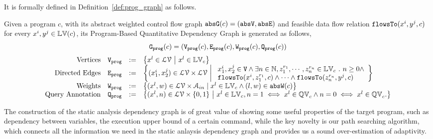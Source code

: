 It is formally defined in Definition~\ref{def:prog_graph} as follows.
\begin{defn}
  \label{def:prog_graph}
Given a program $c$, with its abstract weighted control flow graph $\mathtt{abs}{\mathtt{G}}(c) = (\mathtt{abs}{\mathtt{V}}, \mathtt{abs}{\mathtt{E}})$ and 
feasible data flow relation $\mathtt{flowsTo}(x^i, y^j, c)$ for every $x^i, y^j \in \mathbb{LV}(c)$, its Program-Based Quantitative Dependency Graph
is generated as follows,
$$\mathtt{{G_{prog}}}(c) = (\mathtt{{V_{prog}}}(c), \mathtt{{E_{prog}}}(c), \mathtt{{W_{prog}}}(c), \mathtt{{Q_{prog}}}(c))$$
{\footnotesize
\[
\begin{array}{rlcl}
\text{Vertices} &
\progV & := & \left\{ 
x^l \in \mathcal{LV} 
~ \middle\vert ~
x^l \in \lvar_{c}
\right\}
\\
\text{Directed Edges} &
\progE & := & 
\left\{ 
({x}_1^{i}, {x}_2^{j}) \in \mathcal{LV} \times \mathcal{LV}
~ \middle\vert ~
\begin{array}{l}
  {x}_1^{i}, {x}_2^{j} \in \vertxs
\land
  \exists n \in \mathbb{N}, z_1^{r_1}, \cdots, z_n^{r_n} \in \lvar_{{c}} \st 
  n \geq 0 \land
  \\
  \flowsto(x^i,  z_1^{r_1}, c) 
  \land \cdots \land \flowsto(z_n^{r_n}, y^j, c) 
\end{array}
\right\}
\\
\text{Weights} &
\progW & := &
\left\{ (x^l, w) \in  \mathcal{LV} \times \mathcal{A}_{in}
\mid
x^l \in \lvar_{{c}} \land (l, w) \in \absW(c)
\right\}
\\
\text{Query Annotation} &
\progF & := & 
\left\{(x^l, n)  \in  \mathcal{LV} \times \{0, 1\} 
~ \middle\vert ~
x^l \in \lvar_{c},
n = 1 \iff x^l \in \qvar_{c} \land n = 0 \iff  x^l \in \qvar_{c} .
\right\}
\end{array}
\] }
\end{defn}
The construction of the static analysis dependency graph is of great value of showing some useful properties of the target program,
such as dependency between variables, the execution upper bound of a certain command,
while the key novelty is our path searching algorithm, which connects all the information we need in the static anlaysis dependency graph and provides us a sound over-estimation of adaptivity.

